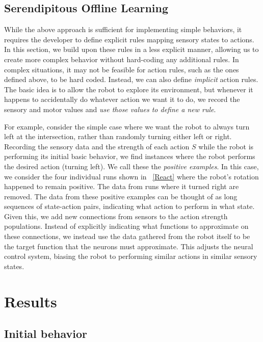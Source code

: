 \documentclass{frontiersSCNS}
\begin{document}
\subsection{Serendipitous Offline Learning} \label{learning}

While the above approach is sufficient for implementing simple behaviors, it requires the developer to define explicit rules mapping sensory states to actions. In this section, we build upon these
rules in a less explicit manner, allowing us to create more complex behavior
without hard-coding any additional rules.  In complex situations, it may not be 
feasible for action rules, such as the ones defined above, to be hard coded. Instead,
we can also define \textit{implicit} action rules. The basic idea is to allow
the robot to explore its environment, but whenever it happens to accidentally
do whatever action we want it to do, we record the sensory and motor 
values and \textit{use those values to define a new rule}.

For example, consider the simple case where we want the robot to always turn left at 
the intersection, rather than randomly turning either left or right. Recording 
the sensory data and the strength of each action $S$ while the robot is 
performing its initial basic behavior, we find instances where the robot 
performs the desired action (turning left). We call these the \textit{positive 
examples}. In this case, we consider the four individual runs shown in 
\figurename~\ref{React} where the robot's rotation happened to remain positive.  
The data from runs where it turned right are removed.  The data from these positive examples can 
be thought of as long sequences of state-action pairs, indicating what action 
to perform in what state. Given this, we add new connections from sensors to 
the action strength populations. Instead of explicitly indicating what functions 
to approximate on these connections, we instead use the data gathered from
the robot itself to be the target function that the neurons must approximate.
This adjusts the neural control system, biasing the robot to performing
similar actions in similar sensory states.

\section{Results}

\subsection{Initial behavior}
\end{document}
